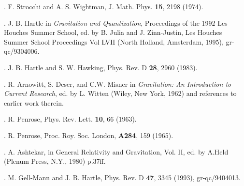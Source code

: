 \item{\SW .}  F. Strocchi and  A. S. Wightman,
J. Math. Phys. {\bf 15}, 2198 (1974).

\item{\HarLH .} J. B. Hartle in {\it Gravitation and Quantization},
Proceedings of the 1992 Les Houches Summer School, ed. by B. Julia
and J. Zinn-Justin, Les Houches Summer School Proceedings Vol LVII
(North Holland, Amsterdam, 1995),  gr-qc/9304006.

\item{\HH .} J. B. Hartle and S. W. Hawking, Phys. Rev. D {\bf 28}, 2960
(1983).

\item{\ADM .} R. Arnowitt, S. Deser, and C.W. Misner in {\sl
Gravitation:
An Introduction to Current Research}, ed. by L. Witten (Wiley,
New York, 1962) and references to earlier work therein.

\item{\Pena .}  R. Penrose, Phys. Rev. Lett. {\bf 10}, 66 (1963).

\item{\Penb .}  R. Penrose,  Proc. Roy. Soc. London, {\bf A284}, 159 (1965).

\item{\Ash .}  A. Ashtekar, in General Relativity and Gravitation,
Vol. II, ed. by A.Held (Plenum Press, N.Y., 1980)  p.37ff.

\item{\GMHB .} M. Gell-Mann and J. B. Hartle, Phys. Rev. D {\bf 47},
3345 (1993), gr-qc/9404013.

\bye








